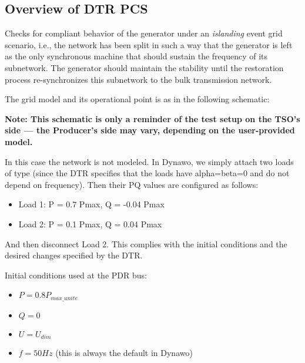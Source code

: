     \subsection{Overview of DTR PCS \DTRPcs}

    Checks for compliant behavior of the generator under an
    \emph{islanding} event grid scenario, i.e., the network has been split in
    such a way that the generator is left as the only synchronous machine
    that should sustain the frequency of its subnetwork. The generator
    should maintain the stability until the restoration process
    re-synchronizes this subnetwork to the bulk transmission network.

    The grid model and its operational point is as in the following schematic:
    \begin{center}
        
    \end{center}
    \begin{center}
        \small \textbf{Note: This schematic is only a reminder of the test setup on the TSO's
        side --- the Producer's side may vary, depending on the user-provided model.}
    \end{center}

    In this case the network is not modeled. In Dynawo, we simply attach
    two loads of type  (since the DTR specifies that the
    loads have alpha=beta=0 and do not depend on frequency). Then their
    PQ values are configured as follows:
    \begin{itemize}
        \item Load 1: P = 0.7 Pmax, Q = -0.04 Pmax
        \item Load 2: P = 0.1 Pmax, Q = 0.04 Pmax
    \end{itemize}
    And then disconnect Load 2. This complies with the initial conditions
    and the desired changes specified by the DTR.

    \begin{description}
        \item Initial conditions used at the PDR bus:
        \begin{itemize}
            \item $P = 0.8 P_{max\_unite}$
            \item $Q = 0$
            \item $U = U_{dim}$
            \item $f = 50 Hz$ (this is always the default in Dynawo)
        \end{itemize}
    \end{description}


